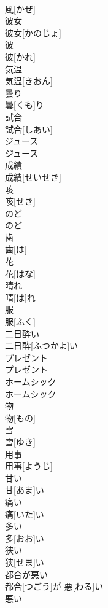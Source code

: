 \documentclass[8pt]{extreport}
\begin{document}
\begin{CJK}{UTF8}{min}
\\	風[かぜ]
\\	彼女	
\\	彼女[かのじょ]
\\	彼	
\\	彼[かれ]
\\	気温	
\\	気温[きおん]
\\	曇り	
\\	曇[くも]り
\\	試合	
\\	試合[しあい]
\\	ジュース	
\\	ジュース
\\	成績	
\\	成績[せいせき]
\\	咳	
\\	咳[せき]
\\	のど	
\\	のど
\\	歯	
\\	歯[は]
\\	花	
\\	花[はな]
\\	晴れ	
\\	晴[は]れ
\\	服	
\\	服[ふく]
\\	二日酔い	
\\	二日酔[ふつかよ]い
\\	プレゼント	
\\	プレゼント
\\	ホームシック	
\\	ホームシック
\\	物	
\\	物[もの]
\\	雪	
\\	雪[ゆき]
\\	用事	
\\	用事[ようじ]
\\	甘い	
\\	甘[あま]い
\\	痛い	
\\	痛[いた]い
\\	多い	
\\	多[おお]い
\\	狭い	
\\	狭[せま]い
\\	都合が悪い	
\\	都合[つごう]が 悪[わる]い
\\	悪い	

\end{CJK}
\end{document}
